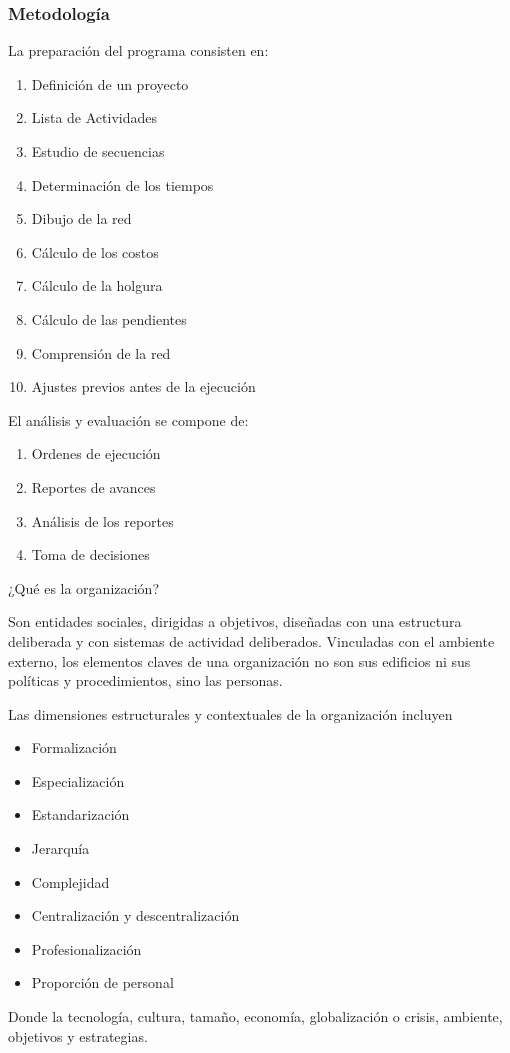 \subsubsection{Metodología}
La preparación del programa consisten en:
\begin{enumerate}
    \item Definición de un proyecto
    \item Lista de Actividades
    \item Estudio de secuencias
    \item Determinación de los tiempos
    \item Dibujo de la red
    \item Cálculo de los costos
    \item Cálculo de la holgura
    \item Cálculo de las pendientes
    \item Comprensión de la red
    \item Ajustes previos antes de la ejecución
\end{enumerate}
El análisis y evaluación se compone de:
\begin{enumerate}
    \item Ordenes de ejecución
    \item Reportes de avances
    \item Análisis de los reportes
    \item Toma de decisiones
\end{enumerate}

¿Qué  es la organización?

Son entidades sociales, dirigidas a objetivos, diseñadas con una estructura deliberada y con sistemas de actividad deliberados. Vinculadas con el ambiente externo, los elementos claves de una organización no son sus edificios ni sus políticas y procedimientos, sino las personas.

Las dimensiones estructurales y contextuales de la organización incluyen
\begin{itemize}
    \item Formalización
    \item Especialización
    \item Estandarización
    \item Jerarquía
    \item Complejidad
    \item Centralización y descentralización
    \item Profesionalización
    \item Proporción de personal
\end{itemize}
Donde la tecnología, cultura, tamaño, economía, globalización o crisis, ambiente, objetivos y estrategias.

